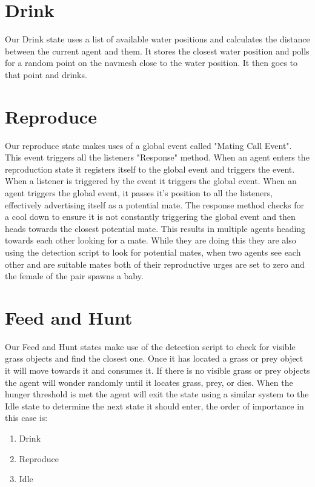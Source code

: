 \documentclass[a4paper, oneside, 11pt]{report}
\begin{document}
\section{Drink}
	Our Drink state uses a list of available water positions and calculates the distance between the current agent and them. It stores the closest water position and polls for a random point on the navmesh close to the water position. It then goes to that point and drinks.
\section{Reproduce}
	Our reproduce state makes uses of a global event called "Mating Call Event". This event triggers all the listeners "Response" method. When an agent enters the reproduction state it registers itself to the global event and triggers the event. When a listener is triggered by the event it triggers the global event. When an agent triggers the global event, it passes it's position to all the listeners, effectively advertising itself as a potential mate. The response method checks for a cool down to ensure it is not constantly triggering the global event and then heads towards the closest potential mate. This results in multiple agents heading towards each other looking for a mate. While they are doing this they are also using the detection script to look for potential mates, when two agents see each other and are suitable mates both of their reproductive urges are set to zero and the female of the pair spawns a baby.
\section{Feed and Hunt}
	Our Feed and Hunt states make use of the detection script to check for visible grass objects and find the closest one. Once it has located a grass or prey object it will move towards it and consumes it. If there is no visible grass or prey objects the agent will wonder randomly until it locates grass, prey, or dies. When the hunger threshold is met the agent will exit the state using a similar system to the Idle state to determine the next state it should enter, the order of importance in this case is:
	\begin{enumerate}
		\item{Drink}
		\item{Reproduce}
		\item{Idle}
	\end{enumerate}
\end{document}
